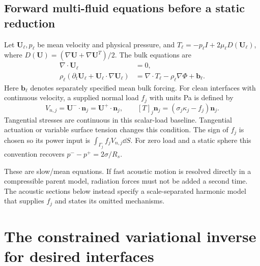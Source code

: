 \subsection{Forward multi-fluid equations before a static reduction}
Let $\mathbf U_\ell,p_\ell$ be mean velocity and physical pressure, and
$T_\ell=-p_\ell I+2\mu_\ell D(\mathbf U_\ell)$, where
$D(\mathbf U)=(\nabla\mathbf U+\nabla\mathbf U^T)/2$. The bulk equations are
\begin{align}
 \nabla\cdot\mathbf U_\ell&=0,\label{eq:mf-divergence}\\
 \rho_\ell(\partial_t\mathbf U_\ell+
 \mathbf U_\ell\cdot\nabla\mathbf U_\ell)
 &=\nabla\cdot T_\ell-\rho_\ell\nabla\Phi+\mathbf b_\ell.
 \label{eq:mf-momentum}
\end{align}
Here $\mathbf b_\ell$ denotes separately specified mean bulk forcing.
For clean interfaces with continuous velocity, a supplied normal load $f_j$
with units Pa is defined by
\begin{equation}\label{eq:mf-interface-laws}
 V_{n,j}=\mathbf U^-\cdot\mathbf n_j=\mathbf U^+\cdot\mathbf n_j,
 \qquad [T]_j\mathbf n_j=(\sigma_j\kappa_j-f_j)\mathbf n_j.
\end{equation}
Tangential stresses are continuous in this scalar-load baseline. Tangential
actuation or variable surface tension changes this condition. The sign of
$f_j$ is chosen so its power input is $\int_{\Gamma_j} f_jV_{n,j}\dd S$.
For zero load and a static sphere this convention recovers
$p^- -p^+=2\sigma/R_s$.

These are slow/mean equations. If fast acoustic motion is resolved directly
in a compressible parent model, radiation forces must not be added a second
time. The acoustic sections below instead specify a scale-separated
harmonic model that supplies $f_j$ and states its omitted mechanisms.

\section{The constrained variational inverse for desired interfaces}
\label{sec:mf-variational-inverse}
